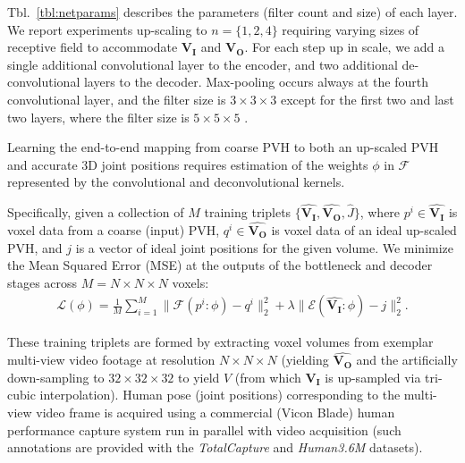 \documentclass[runningheads]{llncs}
\begin{document}
Tbl.~\ref{tbl:netparams} describes the parameters (filter count and size) of each layer.  We report experiments up-scaling to $n=\{1,2,4\}$ requiring varying sizes of receptive field to accommodate $\mathbf{V_I}$ and $\mathbf{V_O}$.  For each step up in scale, we add a single additional convolutional layer to the encoder, and two additional de-convolutional layers to the decoder.  Max-pooling occurs always at the fourth convolutional layer, and the filter size is $3 \times 3 \times 3$ except for the first two and last two layers, where the filter size is $5 \times 5 \times 5$ .

Learning the end-to-end mapping from coarse PVH to both an up-scaled PVH and accurate 3D joint positions requires estimation of the weights $\phi$ in $\mathcal{F}$ represented by the convolutional and deconvolutional kernels.

Specifically, given a collection of $M$ training triplets $\{\hat{\mathbf{V_I}}, \hat{\mathbf{V_O}}, \hat{J}\}$, where $p^i \in \hat{\mathbf{V_I}}$ is voxel data from a coarse (input) PVH, $q^i \in \hat{\mathbf{V_O}}$ is voxel data of an ideal up-scaled PVH, and $j$ is a vector of ideal joint positions for the given volume. We minimize the Mean Squared Error (MSE) at the outputs of the bottleneck and decoder stages across $M=N \times N \times N$ voxels:
\begin{eqnarray}
\mathcal{L(\phi)} = \frac{1}{M}\sum^M_{i=1} \| \mathcal{F}(p^i: \phi) -q^i \|^2_2+\lambda \| \mathcal{E}(\hat{\mathbf{V_I}}: \phi) -j \|^2_2. \label{eq:DualLoss}
\end{eqnarray}

These training triplets are formed by extracting voxel volumes from exemplar multi-view video footage at resolution $N \times N \times N$ (yielding $\hat{\mathbf{V_O}}$ and the artificially down-sampling to  $32 \times 32 \times 32$ to yield $V$ (from which $\mathbf{V_I}$ is up-sampled via tri-cubic interpolation).  Human pose (joint positions) corresponding to the multi-view video frame is acquired using a commercial (Vicon Blade) human performance capture system run in parallel with video acquisition (such annotations are provided with the {\em TotalCapture} and {\em Human3.6M} datasets).
\end{document}
